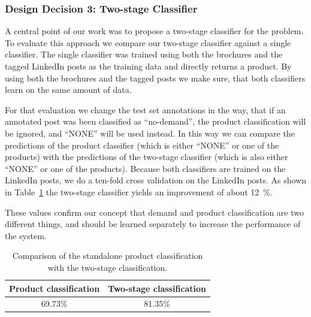 \subsubsection{Design Decision 3: Two-stage Classifier}
\label{sub:two_stage_classifier}

A central point of our work was to propose a two-stage classifier for the \nto problem.
To evaluate this approach we compare our two-stage classifier against a single classifier.
The single classifier was trained using both the brochures and the tagged LinkedIn posts as the training data and directly returns a product.
By using both the brochures and the tagged posts we make sure, that both classifiers learn on the same amount of data.

For that evaluation we change the test set annotations in the way, that if an annotated post was been classified as ``no-demand'', the product classification will be ignored, and ``NONE'' will be used instead.
In this way we can compare the predictions of the product classifier (which is either ``NONE'' or one of the products) with the predictions of the two-stage classifier (which is also either ``NONE'' or one of the products).
Because both classifiers are trained on the LinkedIn posts, we do a ten-fold cross validation on the LinkedIn posts.
As shown in Table~\ref{table:two_stage_eval} the two-stage classifier yields an improvement of about 12~\%.

These values confirm our concept that demand and product classification are two different things, and should be learned separately to increase the performance of the system.

\begin{table}
	\centering
	\begin{tabular}{c|c}
		\hline
		Product classification & Two-stage classification \\
		\hline \hline
		69.73\% & 81.35\% \\
		\hline
	\end{tabular}
	\caption{Comparison of the standalone product classification with the two-stage classification.}
	\label{table:two_stage_eval}
\end{table}
